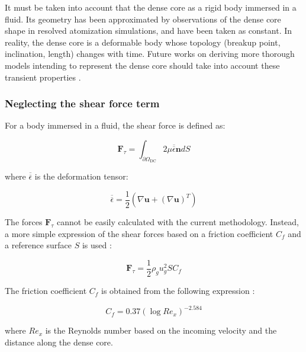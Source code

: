 It must be taken into account that the dense core as a rigid body immersed in a fluid. Its geometry has been approximated by observations of the dense core shape in resolved atomization simulations, and have been taken as constant. In reality, the dense core is a deformable body whose topology (breakup point, inclination, length) changes with time. Future works on deriving more thorough models intending to represent the dense core should take into account these transient properties .

\subsubsection*{Neglecting the shear force term}

For a body immersed in a fluid, the shear force is defined as:

\begin{equation}
\boldsymbol{F}_\tau = \int_{\partial \Omega_\mathrm{DC}} 2 \mu \overline{\overline{\epsilon}} \boldsymbol{n} dS
\end{equation}

where $\overline{\overline{\epsilon}}$ is the deformation tensor:

\begin{equation}
\overline{\overline{\epsilon}} = \frac{1}{2} \left( \nabla \boldsymbol{u} + \left(\nabla \boldsymbol{u}\right)^T \right)
\end{equation}

The forces $\boldsymbol{F}_\tau$ cannot be easily calculated with the current methodology. Instead, a more simple expression of the shear forces based on a friction coefficient $C_f$ and a reference surface $S$ is used :

\begin{equation}
\label{eq:ALM_model_Ftau}
\boldsymbol{F}_\tau = \frac{1}{2} \rho_g u_g^2 S C_f 
\end{equation}

The friction coefficient $C_f$ is obtained from the following expression :

\begin{equation}
\label{eq:ALM_model_Cf}
C_f = 0.37 \left( \log Re_x \right)^{-2.584}
\end{equation}

where $Re_x$ is the Reynolds number based on the incoming velocity and the distance along the dense core.


